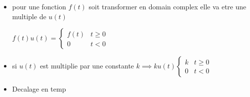 \documentclass[12pt]{book}
\begin{document}
            \begin{itemize}
                \item pour une fonction $f(t)$ soit transformer en domain complex elle va etre une multiple de $u(t)$
                    \begin{center}
                        $f(t)u(t) = \begin{cases}
                            f(t) & t \geq 0 \\
                            0 & t< 0
                        \end{cases}$
                    \end{center}
                \item  si $u(t)$ est multiplie par une constante $k \implies ku(t) \begin{cases}
                    k & t \geq 0 \\
                    0 & t < 0
                \end{cases}$
                \item Decalage en temp 
\end{itemize}
\end{document}

